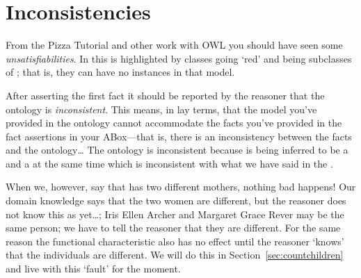 \section{Inconsistencies}

From the Pizza Tutorial and other work with OWL you should have seen some \emph{unsatisfiabilities}. In \protege this is highlighted by classes going `red' and being subclasses of ; that is, they can have no instances in that model.


After asserting the first fact it should be reported by the reasoner that the ontology is \emph{inconsistent}. 
This means, in lay terms, that the model you've provided in the ontology cannot accommodate the facts you've provided in the fact assertions  in your ABox---that is, there is an inconsistency between the facts and the ontology\ldots
The ontology is inconsistent because \ids is being inferred to be a \man and a \woman at the same time which is inconsistent with what we have said in the \fhkb. 

When we, however, say that \rds has two different mothers, nothing bad happens! Our domain knowledge says that the two women are different, but the reasoner does not know this as yet\ldots; Iris Ellen Archer  and Margaret Grace Rever may be the same person; we have to tell the reasoner that they are different. For the same reason the functional characteristic also has no effect until the reasoner `knows' that the individuals are different. \herebedragons We will do this in Section~\ref{sec:countchildren} and live with this	 `fault' for the moment.


